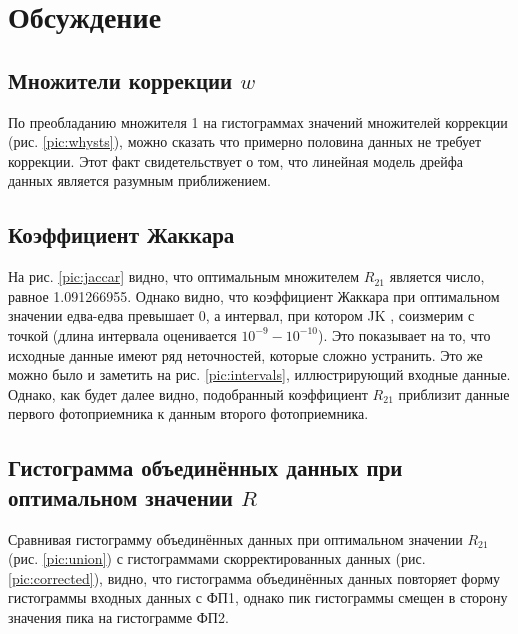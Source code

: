 \section{Обсуждение}

\subsection{Множители коррекции $w$}
По преобладанию множителя 1 на гистограммах значений множителей коррекции (рис. \ref{pic:whysts}), можно сказать что примерно половина данных не требует коррекции. Этот факт свидетельствует о том, что линейная модель дрейфа данных является разумным приближением.

\subsection{Коэффициент Жаккара}
На рис. \ref{pic:jaccar} видно, что оптимальным множителем $R_{21}$ является число, равное 1.091266955. Однако видно, что коэффициент Жаккара при оптимальном значении едва-едва превышает 0, а интервал, при котором JK , соизмерим с точкой (длина интервала оценивается $10^{-9} - 10^{-10} $). Это показывает на то, что исходные данные имеют ряд неточностей, которые сложно устранить. Это же можно было и заметить на рис. \ref{pic:intervals}, иллюстрирующий входные данные. Однако, как будет далее видно, подобранный коэффициент $R_{21}$ приблизит данные первого фотоприемника к данным второго фотоприемника.

\subsection{Гистограмма объединённых данных при оптимальном значении $R$}
Сравнивая гистограмму объединённых данных при оптимальном значении $R_{21}$ (рис. \ref{pic:union}) с гистограммами скорректированных данных (рис. \ref{pic:corrected}), видно, что гистограмма объединённых данных повторяет форму гистограммы входных данных с ФП1, однако пик гистограммы смещен в сторону значения пика на гистограмме ФП2.

\newpage
